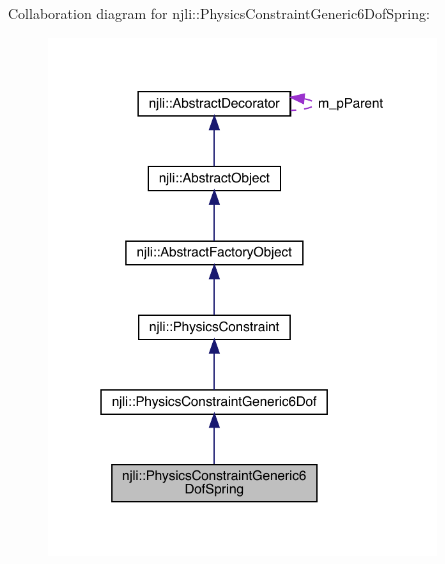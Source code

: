 Collaboration diagram for njli\+:\+:Physics\+Constraint\+Generic6\+Dof\+Spring\+:\nopagebreak
\begin{figure}[H]
\begin{center}
\leavevmode
\includegraphics[width=292pt]{classnjli_1_1_physics_constraint_generic6_dof_spring__coll__graph}
\end{center}
\end{figure}
